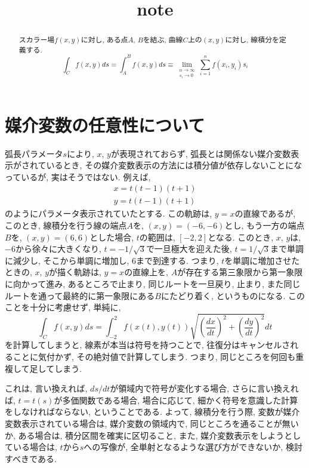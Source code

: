 \documentclass{jsarticle} \usepackage[dvipdfmx]{graphicx} \usepackage[dvipdfmx]{hyperref}
\title{note}
\begin{document}
\maketitle

\begin{abstract}
  スカラー場$f(x, y)$に対し, ある点$A$, $B$を結ぶ, 曲線$C$上の$(x, y)$に対し, 線積分を定義する. 
  \begin{equation}
    \int_C f(x, y)ds = \int_A^B f(x, y)ds \equiv \lim_{\substack{n \to \infty \\ s_i \to 0}}\sum_{i = 1}^n f(x_i, y_i)s_i
  \end{equation}
\end{abstract}

\section*{媒介変数の任意性について}
弧長パラメータ$s$により, $x$, $y$が表現されておらず, 弧長とは関係ない媒介変数表示がされているとき, その媒介変数表示の方法には積分値が依存しないことになっているが, 実はそうではない. 
例えば, 
\begin{eqnarray*}
  x = t(t-1)(t+1) \nonumber \\
  y = t(t-1)(t+1)
\end{eqnarray*}
のようにパラメータ表示されていたとする. 
この軌跡は, $y = x$の直線であるが, このとき, 線積分を行う線の端点$A$を, $(x, y) = (-6, -6)$とし, もう一方の端点$B$を, $(x, y) = (6, 6)$とした場合, $t$の範囲は, $[-2, 2]$となる. 
このとき, $x$, $y$は, $-6$から徐々に大きくなり, $t = -1/\sqrt{3}$で一旦極大を迎えた後, $t = 1/\sqrt{3}$まで単調に減少し, そこから単調に増加し, $6$まで到達する. 
つまり, $t$を単調に増加させたときの, $x$, $y$が描く軌跡は, $y = x$の直線上を, $A$が存在する第三象限から第一象限に向かって進み, あるところで止まり, 同じルートを一旦戻り, 止まり, また同じルートを通って最終的に第一象限にある$B$にたどり着く, というものになる. 
このことを十分に考慮せず, 単純に, 
\begin{equation}
  \int_C f(x, y)ds = \int_{-2}^2 f(x(t), y(t))\sqrt{\left(\frac{dx}{dt}\right)^2 + \left(\frac{dy}{dt}\right)^2}dt
\end{equation}
を計算してしまうと, 線素が本当は符号を持つことで, 往復分はキャンセルされることに気付かず, その絶対値で計算してしまう. つまり, 同じところを何回も重複して足してしまう. 

これは, 言い換えれば, $ds/dt$が領域内で符号が変化する場合, さらに言い換えれば, $t = t(s)$が多価関数である場合, 場合に応じて, 細かく符号を意識した計算をしなければならない, ということである. 
よって, 線積分を行う際, 変数が媒介変数表示されている場合は, 媒介変数の領域内で, 同じところを通ることが無いか, ある場合は, 積分区間を確実に区切ること, また, 媒介変数表示をしようとしている場合は, $t$から$s$への写像が, 全単射となるような選び方ができないか, 検討すべきである. 
\end{document}
